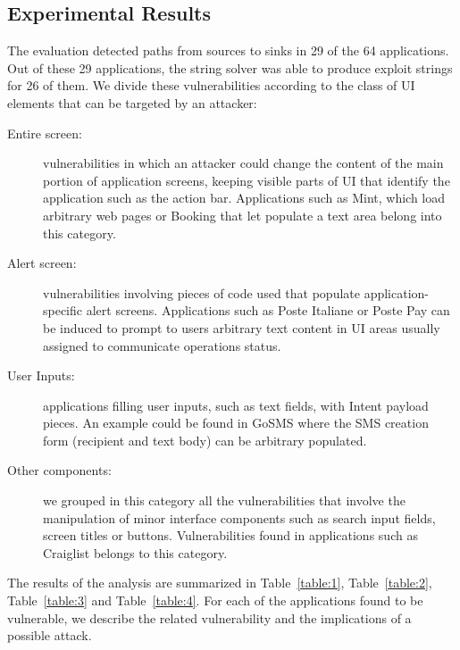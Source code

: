 
\subsection{Experimental Results}
The evaluation detected paths from sources to sinks in 29 of the 64 applications. Out of these 29 applications, the string solver was able to produce exploit strings for 26 of them. We divide these vulnerabilities according to the class of UI elements that can be targeted by an attacker:
\begin{description}
    \item[Entire screen:] vulnerabilities in which
        an attacker could change the content of the main portion of application screens, keeping
        visible parts of UI that identify the application such as the action bar.
        Applications such as Mint, which load arbitrary web pages or Booking that let populate a text area belong into this category.
    \item[Alert screen:] vulnerabilities involving pieces of code used that populate application-specific alert screens. Applications such as Poste Italiane or Poste Pay can be induced to prompt to users arbitrary text content in UI areas usually
        assigned to communicate operations status.
    \item[User Inputs:] applications filling user inputs, such as text fields, with Intent
        payload pieces. An example could be found in GoSMS where the
        SMS creation form (recipient and text body) can be arbitrary populated.
    \item[Other components:] we grouped in this category all the vulnerabilities that involve
        the manipulation of minor interface components such as search input fields, screen titles or
        buttons. Vulnerabilities found in applications such as Craiglist belongs to this category.
\end{description}

The results of the analysis are summarized in Table~\ref{table:1}, Table~\ref{table:2}, Table~\ref{table:3}
 and Table~\ref{table:4}. For each of the applications found to be vulnerable, we describe the related vulnerability and the implications of a possible attack.


